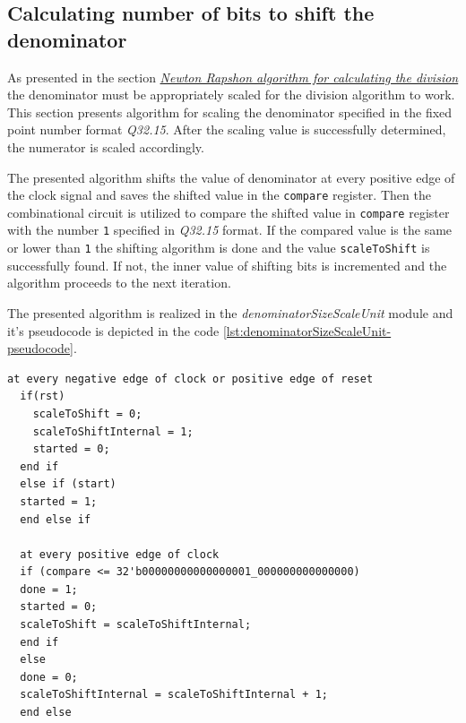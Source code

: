 \documentclass[a4paper, twoside, 11pt]{article}
\begin{document}
\subsection{Calculating number of bits to shift the denominator}\label{subsec:calculating-number-of-bits-to-shift-the-denominator}
As presented in the section \hyperref[subsection:newton-raphson-algorithm-for-calculating-the-division]{\textit{Newton Rapshon algorithm for calculating the division}} the denominator must be appropriately scaled for the division algorithm to work. This section presents algorithm for scaling the denominator specified in the fixed point number format \textit{Q32.15}. After the scaling value is successfully determined, the numerator is scaled accordingly.
\par
The presented algorithm shifts the value of denominator at every positive edge of the clock signal and saves the shifted value in the \texttt{compare} register. Then the combinational circuit is utilized to compare the shifted value in \texttt{compare} register with the number \texttt{1} specified in \textit{Q32.15} format. If the compared value is the same or lower than \texttt{1} the shifting algorithm is done and the value \texttt{scaleToShift} is successfully found. If not, the inner value of shifting bits is incremented and the algorithm proceeds to the next iteration.\par
The presented algorithm is realized in the \textit{denominatorSizeScaleUnit} module and it's pseudocode is depicted in the code \ref{lst:denominatorSizeScaleUnit-pseudocode}.

\begin{lstlisting}[language={pseudocode}, caption={Pseudocode for the denominatorSizeScaleUnit module algorithm.}, label= {lst:denominatorSizeScaleUnit-pseudocode}]
  at every negative edge of clock or positive edge of reset
  if(rst)
    scaleToShift = 0;
    scaleToShiftInternal = 1;
    started = 0;
  end if
  else if (start)
  started = 1;
  end else if

  at every positive edge of clock
  if (compare <= 32'b00000000000000001_000000000000000)
  done = 1;
  started = 0;
  scaleToShift = scaleToShiftInternal;
  end if
  else
  done = 0;
  scaleToShiftInternal = scaleToShiftInternal + 1;
  end else
\end{lstlisting}
\end{document}
